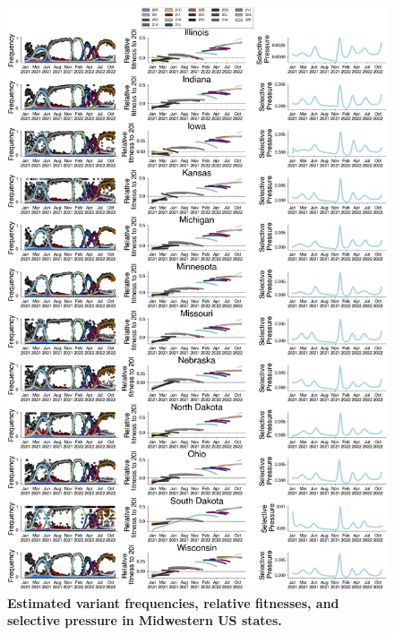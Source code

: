 \documentclass[11pt,oneside,letterpaper]{article}
\begin{document}
\begin{figure}[t!]
    \centering
    \includegraphics[width=1.0\textwidth=0.01]{./supplementary_figures/selective-pressure-analysis_Midwest.png}
    \caption{
      \textbf{Estimated variant frequencies, relative fitnesses, and selective pressure in Midwestern US states.}
    }
    \label{fig:selective_pressure_midwest}
\end{figure}
\end{document}
